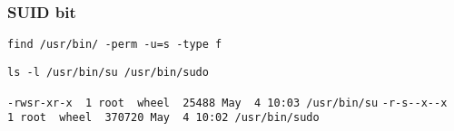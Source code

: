 \begin{frame}[fragile]
	\frametitle{SUID bit}

\begin{lstlisting}
find /usr/bin/ -perm -u=s -type f
\end{lstlisting}

\begin{lstlisting}
ls -l /usr/bin/su /usr/bin/sudo
\end{lstlisting}
\verb|-rwsr-xr-x  1 root  wheel  25488 May  4 10:03 /usr/bin/su|
\verb|-r-s--x--x  1 root  wheel  370720 May  4 10:02 /usr/bin/sudo|

\end{frame}

